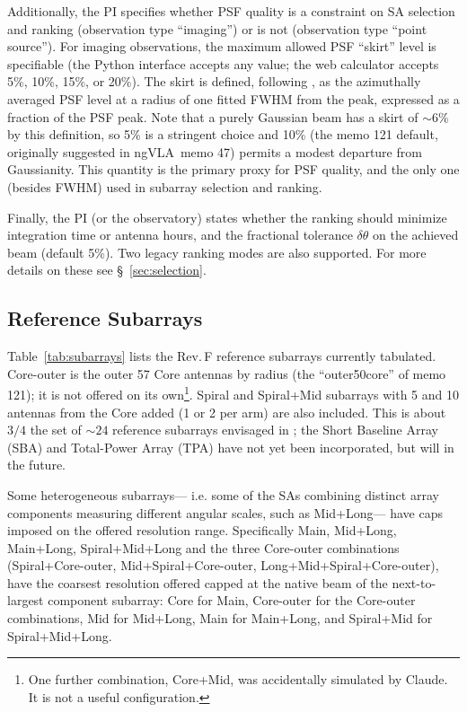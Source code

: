 \documentclass[11pt]{article}
\newcommand{\ngvla}{ngVLA}
\begin{document}
Additionally, the PI specifies whether PSF quality is a constraint on
SA selection and ranking (observation type ``imaging'') or is not
(observation type ``point source'').  For imaging observations, the
maximum allowed PSF ``skirt'' level is specifiable (the Python
interface accepts any value; the web calculator accepts 5\%, 10\%,
15\%, or 20\%).  The skirt is defined, following \citep{memo106}, as
the azimuthally averaged PSF level at a radius of one fitted FWHM from
the peak, expressed as a fraction of the PSF peak.  Note that a purely
Gaussian beam has a skirt of $\sim 6\%$ by this definition, so 5\% is
a stringent choice and 10\% (the memo 121 default, originally
suggested in \ngvla\ memo 47) permits a modest departure from
Gaussianity.  This quantity is the primary proxy for PSF quality, and
the only one (besides FWHM) used in subarray selection and ranking.

Finally, the PI (or the observatory) states whether the ranking should
minimize integration time or antenna hours, and the fractional
tolerance $\delta \theta$ on the achieved beam (default 5\%). Two
legacy ranking modes are also supported. For more details on these
see \S~\ref{sec:selection}.

\subsection{Reference Subarrays}
\label{sec:refsa}

Table~\ref{tab:subarrays} lists the Rev.\,F reference subarrays currently tabulated.  
Core-outer is the outer 57 Core antennas by radius (the ``outer50core'' 
of memo 121); it is not offered on its own\footnote{One further combination, Core+Mid, was accidentally simulated by 
Claude. It is not a useful configuration.}.  Spiral and Spiral+Mid subarrays with 5 and 10 antennas from the Core 
added (1 or 2 per arm) are also included. This is about $3/4$ the set of $\sim 24$ reference subarrays envisaged in 
\citep{saNarrative}; the Short Baseline Array (SBA) \citep{memo43} and Total-Power Array (TPA) \citep{tpconcept} have 
not yet been incorporated, but will in the future.

Some heterogeneous subarrays--- i.e. some of the SAs combining
distinct array components measuring different angular scales, such as
Mid+Long--- have caps imposed on the offered resolution
range. Specifically Main, Mid+Long, Main+Long, Spiral+Mid+Long and the
three Core-outer combinations (Spiral+Core-outer,
Mid+Spiral+Core-outer, Long+Mid+Spiral+Core-outer), have the coarsest
resolution offered capped at the native beam of the next-to-largest
component subarray: Core for Main, Core-outer for the Core-outer
combinations, Mid for Mid+Long, Main for Main+Long, and Spiral+Mid for
Spiral+Mid+Long.
\end{document}
